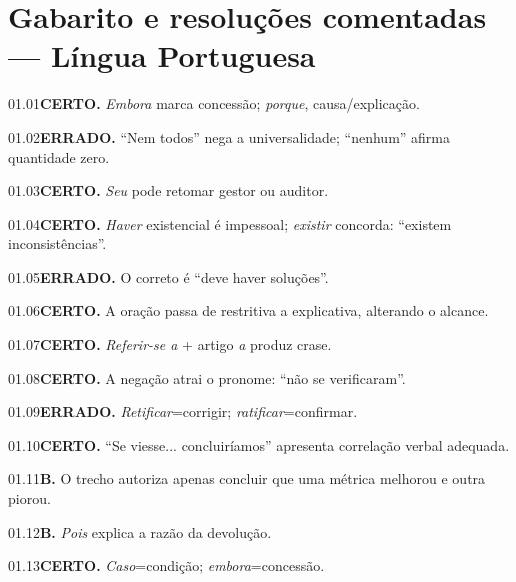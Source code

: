 \section{Gabarito e resoluções comentadas — Língua Portuguesa}

\begin{solucao}{01.01}\textbf{CERTO.} \emph{Embora} marca concessão; \emph{porque}, causa/explicação.\end{solucao}
\begin{solucao}{01.02}\textbf{ERRADO.} ``Nem todos'' nega a universalidade; ``nenhum'' afirma quantidade zero.\end{solucao}
\begin{solucao}{01.03}\textbf{CERTO.} \emph{Seu} pode retomar gestor ou auditor.\end{solucao}
\begin{solucao}{01.04}\textbf{CERTO.} \emph{Haver} existencial é impessoal; \emph{existir} concorda: ``existem inconsistências''.\end{solucao}
\begin{solucao}{01.05}\textbf{ERRADO.} O correto é ``deve haver soluções''.\end{solucao}
\begin{solucao}{01.06}\textbf{CERTO.} A oração passa de restritiva a explicativa, alterando o alcance.\end{solucao}
\begin{solucao}{01.07}\textbf{CERTO.} \emph{Referir-se a} + artigo \emph{a} produz crase.\end{solucao}
\begin{solucao}{01.08}\textbf{CERTO.} A negação atrai o pronome: ``não se verificaram''.\end{solucao}
\begin{solucao}{01.09}\textbf{ERRADO.} \emph{Retificar}=corrigir; \emph{ratificar}=confirmar.\end{solucao}
\begin{solucao}{01.10}\textbf{CERTO.} ``Se viesse... concluiríamos'' apresenta correlação verbal adequada.\end{solucao}
\begin{solucao}{01.11}\textbf{B.} O trecho autoriza apenas concluir que uma métrica melhorou e outra piorou.\end{solucao}
\begin{solucao}{01.12}\textbf{B.} \emph{Pois} explica a razão da devolução.\end{solucao}
\begin{solucao}{01.13}\textbf{CERTO.} \emph{Caso}=condição; \emph{embora}=concessão.\end{solucao}
